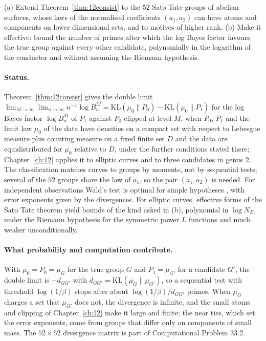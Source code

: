 \begin{problem}\label{op:bayes}
(a) Extend Theorem~\ref{thm:12consist} to the $52$ Sato Tate groups of abelian surfaces, whose laws of the normalised coefficients $(a_1,a_2)$ can have atoms and components on lower dimensional sets, and to motives of higher rank. (b) Make it effective: bound the number of primes after which the log Bayes factor favours the true group against every other candidate, polynomially in the logarithm of the conductor and without assuming the Riemann hypothesis.
\end{problem}

\paragraph{Status.} Theorem~\ref{thm:12consist} gives the double limit $\lim_{M\to\infty}\lim_{n\to\infty}n^{-1}\log B_n^M=\mathrm{KL}(\mu_0\|P_0)-\mathrm{KL}(\mu_0\|P_1)$ for the log Bayes factor $\log B_n^M$ of $P_1$ against $P_0$ clipped at level $M$, when $P_0$, $P_1$ and the limit law $\mu_0$ of the data have densities on a compact set with respect to Lebesgue measure plus counting measure on a fixed finite set $D$ and the data are equidistributed for $\mu_0$ relative to $D$, under the further conditions stated there; Chapter~\ref{ch:12} applies it to elliptic curves and to three candidates in genus $2$. The classification \cite{fkrs2012} matches curves to groups by moments, not by sequential tests; several of the $52$ groups share the law of $a_1$, so the pair $(a_1,a_2)$ is needed. For independent observations Wald's test \cite{wald1947} is optimal for simple hypotheses \cite{waldwolfowitz1948}, with error exponents given by the divergences. For elliptic curves, effective forms of the Sato Tate theorem \cite{rousethorner2017,thorner2021} yield bounds of the kind asked in (b), polynomial in $\log N_E$ under the Riemann hypothesis for the symmetric power $L$ functions and much weaker unconditionally.

\paragraph{What probability and computation contribute.} With $\mu_0=P_0=\mu_G$ for the true group $G$ and $P_1=\mu_{G'}$ for a candidate $G'$, the double limit is $-d_{GG'}$ with $d_{GG'}=\mathrm{KL}(\mu_G\|\mu_{G'})$, so a sequential test with threshold $\log(1/\beta)$ stops after about $\log(1/\beta)/d_{GG'}$ primes. When $\mu_G$ charges a set that $\mu_{G'}$ does not, the divergence is infinite, and the small atoms and clipping of Chapter~\ref{ch:12} make it large and finite; the near ties, which set the error exponents, come from groups that differ only on components of small mass. The $52\times52$ divergence matrix is part of Computational Problem 33.2.

